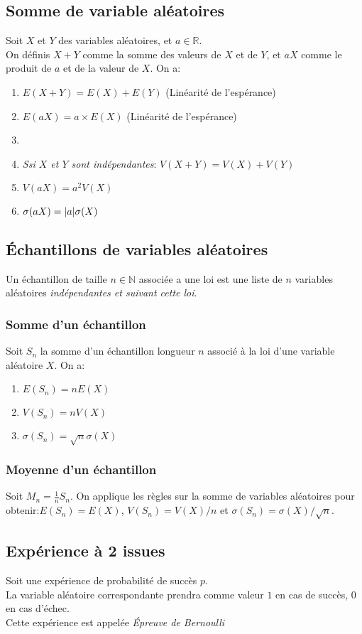 \documentclass{article}
\begin{document}
\subsection{Somme de variable aléatoires}
Soit $X$ et $Y$ des variables aléatoires, et $a\in\mathbb{R}$.\\
On définis $X + Y$ comme la somme des valeurs de $X$ et de $Y$, et $aX$ comme le produit de $a$ et de la valeur de $X$.
On a:
\begin{enumerate}
	\item $E(X + Y) = E(X) + E(Y)$ (Linéarité de l'espérance)
	\item $E(aX) = a\times E(X)$ (Linéarité de l'espérance)
	\item[]
	\item \emph{Ssi $X$ et $Y$ sont indépendantes}: $V(X + Y) = V(X) + V(Y)$ 
	\item $V(aX) = a^2V(X)$
	\item $\sigma(aX) = \abs{a}\sigma(X)$
\end{enumerate}

\subsection{Échantillons de variables aléatoires}
Un échantillon de taille $n\in\mathbb{N}$ associée a une loi est une liste de $n$ variables aléatoires \emph{indépendantes et suivant cette loi}.
\subsubsection{Somme d'un échantillon}
Soit $S_n$ la somme d'un échantillon longueur $n$ associé à la loi d'une variable aléatoire $X$. On a:
\begin{enumerate}
	\item $E(S_n) = nE(X)$
	\item $V(S_n) = nV(X)$
	\item $\sigma(S_n) = \sqrt{n}\sigma(X)$
\end{enumerate}
\subsubsection{Moyenne d'un échantillon }
Soit $M_n = \frac{1}{n}S_n$. On applique les règles sur la somme de variables aléatoires pour obtenir:$E(S_n) = E(X)$, $V(S_n) = V(X)/n$ et $\sigma(S_n) = \sigma(X)/\sqrt{n}$.

\subsection{Expérience à 2 issues}
Soit une expérience de probabilité de succès $p$.\\ La variable aléatoire correspondante prendra comme valeur $1$ en cas de succès, $0$ en cas d'échec.
\\ Cette expérience est appelée \textit{Épreuve de Bernoulli}
\end{document}
